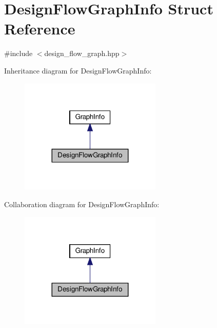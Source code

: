\hypertarget{structDesignFlowGraphInfo}{}\section{Design\+Flow\+Graph\+Info Struct Reference}
\label{structDesignFlowGraphInfo}


{\ttfamily \#include $<$design\+\_\+flow\+\_\+graph.\+hpp$>$}



Inheritance diagram for Design\+Flow\+Graph\+Info\+:
\nopagebreak
\begin{figure}[H]
\begin{center}
\leavevmode
\includegraphics[width=191pt]{d6/d6f/structDesignFlowGraphInfo__inherit__graph}
\end{center}
\end{figure}


Collaboration diagram for Design\+Flow\+Graph\+Info\+:
\nopagebreak
\begin{figure}[H]
\begin{center}
\leavevmode
\includegraphics[width=191pt]{de/d21/structDesignFlowGraphInfo__coll__graph}
\end{center}
\end{figure}
